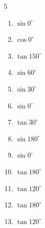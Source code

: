 \begin{multicols}{5}
\begin{enumerate}
  \item $\displaystyle \sin{0^\circ}$

        \phantom{$\displaystyle =0$}

  \item $\displaystyle \cos{0^\circ}$

        \phantom{$\displaystyle =1$}

  \item $\displaystyle \tan{150^\circ}$


  \item $\displaystyle \sin{60^\circ}$


  \item $\displaystyle \sin{30^\circ}$


  \item $\displaystyle \sin{0^\circ}$

        \phantom{$\displaystyle =0$}

  \item $\displaystyle \tan{30^\circ}$


  \item $\displaystyle \sin{180^\circ}$

        \phantom{$\displaystyle =0$}

  \item $\displaystyle \sin{0^\circ}$

        \phantom{$\displaystyle =0$}

  \item $\displaystyle \tan{180^\circ}$

        \phantom{$\displaystyle =0$}

\columnbreak %

  \item $\displaystyle \tan{120^\circ}$


  \item $\displaystyle \tan{180^\circ}$

        \phantom{$\displaystyle =0$}

  \item $\displaystyle \tan{120^\circ}$


\end{enumerate}
\end{multicols}
